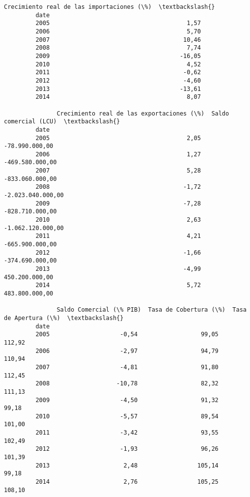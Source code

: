 \documentclass[11pt]{article}
\begin{document}
\begin{Verbatim}[commandchars=\\\{\}]
               Crecimiento real de las importaciones (\%)  \textbackslash{}
         date                                              
         2005                                       1,57   
         2006                                       5,70   
         2007                                      10,46   
         2008                                       7,74   
         2009                                     -16,05   
         2010                                       4,52   
         2011                                      -0,62   
         2012                                      -4,60   
         2013                                     -13,61   
         2014                                       8,07   
         
               Crecimiento real de las exportaciones (\%)  Saldo comercial (LCU)  \textbackslash{}
         date                                                                     
         2005                                       2,05         -78.990.000,00   
         2006                                       1,27        -469.580.000,00   
         2007                                       5,28        -833.060.000,00   
         2008                                      -1,72      -2.023.040.000,00   
         2009                                      -7,28        -828.710.000,00   
         2010                                       2,63      -1.062.120.000,00   
         2011                                       4,21        -665.900.000,00   
         2012                                      -1,66        -374.690.000,00   
         2013                                      -4,99         450.200.000,00   
         2014                                       5,72         483.800.000,00   
         
               Saldo Comercial (\% PIB)  Tasa de Cobertura (\%)  Tasa de Apertura (\%)  \textbackslash{}
         date                                                                         
         2005                    -0,54                  99,05                112,92   
         2006                    -2,97                  94,79                110,94   
         2007                    -4,81                  91,80                112,45   
         2008                   -10,78                  82,32                111,13   
         2009                    -4,50                  91,32                 99,18   
         2010                    -5,57                  89,54                101,00   
         2011                    -3,42                  93,55                102,49   
         2012                    -1,93                  96,26                101,39   
         2013                     2,48                 105,14                 99,18   
         2014                     2,76                 105,25                108,10   
         

\end{Verbatim}
\end{document}
